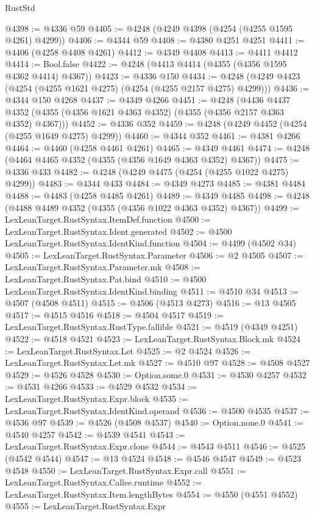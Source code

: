 \begin{lexlean}{RustStd}
\begin{coremodule}
{\begin{coremodule}
{{{{{{{{{{{{{{{{{{{{{{{{{{{{{{{{{{{{{{{{{{{{{{{{{{{{{{{@4398 := @4336 @59
@4405 := @4248 (@4249 @4398 (@4254 (@4255 @1595 @4261) @4299))
@4406 := @4344 @59
@4408 := @4380 @4251 @4251
@4411 := @4406 (@4258 @4408 @4261)
@4412 := @4349 @4408
@4413 := @4411 @4412
@4414 := Bool.false
@4422 := @4248 (@4413 @4414 (@4355 (@4356 @1595 @4362 @4414) @4367))
@4423 := @4336 @150
@4434 := @4248 (@4249 @4423 (@4254 (@4255 @1621 @4275) (@4254 (@4255 @2157 @4275) @4299)))
@4436 := @4344 @150 @4268
@4437 := @4349 @4266
@4451 := @4248
    (@4436 @4437 @4352 (@4355 (@4356 @1621 @4363 @4352) (@4355 (@4356 @2157 @4363 @4352) @4367)))
@4452 := @4336 @352
@4459 := @4248 (@4249 @4452 (@4254 (@4255 @1649 @4275) @4299))
@4460 := @4344 @352
@4461 := @4381 @4266
@4464 := @4460 (@4258 @4461 @4261)
@4465 := @4349 @4461
@4474 := @4248 (@4464 @4465 @4352 (@4355 (@4356 @1649 @4363 @4352) @4367))
@4475 := @4336 @433
@4482 := @4248 (@4249 @4475 (@4254 (@4255 @1022 @4275) @4299))
@4483 := @4344 @433
@4484 := @4349 @4273
@4485 := @4381 @4484
@4488 := @4483 (@4258 @4485 @4261)
@4489 := @4349 @4485
@4498 := @4248 (@4488 @4489 @4352 (@4355 (@4356 @1022 @4363 @4352) @4367))
@4499 := LexLeanTarget.RustSyntax.ItemDef.function
@4500 := LexLeanTarget.RustSyntax.Ident.generated
@4502 := @4500 LexLeanTarget.RustSyntax.IdentKind.function
@4504 := @4499 (@4502 @34)
@4505 := LexLeanTarget.RustSyntax.Parameter
@4506 := @2 @4505
@4507 := LexLeanTarget.RustSyntax.Parameter.mk
@4508 := LexLeanTarget.RustSyntax.Pat.bind
@4510 := @4500 LexLeanTarget.RustSyntax.IdentKind.binding
@4511 := @4510 @34
@4513 := @4507 (@4508 @4511)
@4515 := @4506 (@4513 @4273)
@4516 := @13 @4505
@4517 := @4515 @4516
@4518 := @4504 @4517
@4519 := LexLeanTarget.RustSyntax.RustType.fallible
@4521 := @4519 (@4349 @4251)
@4522 := @4518 @4521
@4523 := LexLeanTarget.RustSyntax.Block.mk
@4524 := LexLeanTarget.RustSyntax.Let
@4525 := @2 @4524
@4526 := LexLeanTarget.RustSyntax.Let.mk
@4527 := @4510 @97
@4528 := @4508 @4527
@4529 := @4526 @4528
@4530 := Option.some.{0}
@4531 := @4530 @4257
@4532 := @4531 @4266
@4533 := @4529 @4532
@4534 := LexLeanTarget.RustSyntax.Expr.block
@4535 := LexLeanTarget.RustSyntax.IdentKind.operand
@4536 := @4500 @4535
@4537 := @4536 @97
@4539 := @4526 (@4508 @4537)
@4540 := Option.none.{0}
@4541 := @4540 @4257
@4542 := @4539 @4541
@4543 := LexLeanTarget.RustSyntax.Expr.clone
@4544 := @4543 @4511
@4546 := @4525 (@4542 @4544)
@4547 := @13 @4524
@4548 := @4546 @4547
@4549 := @4523 @4548
@4550 := LexLeanTarget.RustSyntax.Expr.call
@4551 := LexLeanTarget.RustSyntax.Callee.runtime
@4552 := LexLeanTarget.RustSyntax.Item.lengthBytes
@4554 := @4550 (@4551 @4552)
@4555 := LexLeanTarget.RustSyntax.Expr
}}}}}}}}}}}}}}}}}}}}}}}}}}}}}}}}}}}}}}}}}}}}}}}}}}}}}}}
\end{coremodule}}
\end{coremodule}
\end{lexlean}
